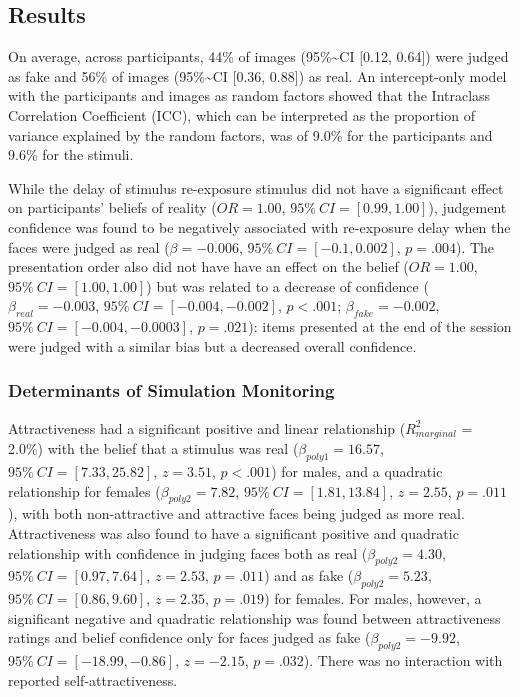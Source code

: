 \documentclass[
  man,floatsintext]{apa6}
\begin{document}
\hypertarget{results}{%
\subsection{Results}\label{results}}

On average, across participants, 44\% of images (95\%\textasciitilde CI {[}0.12, 0.64{]}) were judged as fake and 56\% of images (95\%\textasciitilde CI {[}0.36, 0.88{]}) as real. An intercept-only model with the participants and images as random factors showed that the Intraclass Correlation Coefficient (ICC), which can be interpreted as the proportion of variance explained by the random factors, was of 9.0\% for the participants and 9.6\% for the stimuli.

While the delay of stimulus re-exposure stimulus did not have a significant effect on participants' beliefs of reality (\(OR = 1.00\), \(95\%~CI = [0.99, 1.00]\)), judgement confidence was found to be negatively associated with re-exposure delay when the faces were judged as real (\(\beta = -0.006\), \(95\%~CI = [-0.1, 0.002]\), \(p = .004\)). The presentation order also did not have have an effect on the belief (\(OR = 1.00\), \(95\%~CI = [1.00, 1.00]\)) but was related to a decrease of confidence (\(\beta_{real} = -0.003\), \(95\%~CI = [-0.004, -0.002]\), \(p < .001\); \(\beta_{fake} = -0.002\), \(95\%~CI = [-0.004, -0.0003]\), \(p = .021\)): items presented at the end of the session were judged with a similar bias but a decreased overall confidence.

\hypertarget{determinants-of-simulation-monitoring}{%
\subsubsection{Determinants of Simulation Monitoring}\label{determinants-of-simulation-monitoring}}

Attractiveness had a significant positive and linear relationship (\(R^2_{marginal}\) = 2.0\%) with the belief that a stimulus was real (\(\beta_{poly1} = 16.57\), \(95\%~CI = [7.33, 25.82]\), \(z = 3.51\), \(p < .001\)) for males, and a quadratic relationship for females (\(\beta_{poly2} = 7.82\), \(95\%~CI = [1.81, 13.84]\), \(z = 2.55\), \(p = .011\)), with both non-attractive and attractive faces being judged as more real. Attractiveness was also found to have a significant positive and quadratic relationship with confidence in judging faces both as real (\(\beta_{poly2} = 4.30\), \(95\%~CI = [0.97, 7.64]\), \(z = 2.53\), \(p = .011\)) and as fake (\(\beta_{poly2} = 5.23\), \(95\%~CI = [0. 86, 9.60]\), \(z = 2.35\), \(p = .019\)) for females. For males, however, a significant negative and quadratic relationship was found between attractiveness ratings and belief confidence only for faces judged as fake (\(\beta_{poly2} = -9.92\), \(95\%~CI = [-18.99, -0.86]\), \(z = -2.15\), \(p = .032\)). There was no interaction with reported self-attractiveness.
\end{document}
